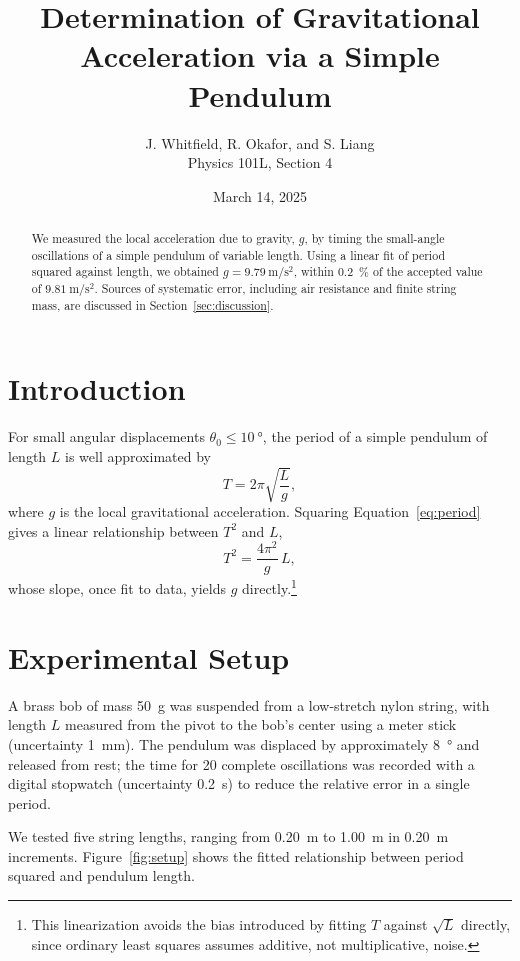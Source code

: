 \documentclass[11pt]{article}
\title{Determination of Gravitational Acceleration via a Simple Pendulum}
\author{J. Whitfield, R. Okafor, and S. Liang \\ Physics 101L, Section 4}
\date{March 14, 2025}
\begin{document}
\maketitle

\begin{abstract}
We measured the local acceleration due to gravity, $g$, by timing the small-angle
oscillations of a simple pendulum of variable length. Using a linear fit of period
squared against length, we obtained $g = \SI{9.79}{\metre\per\second\squared}$, within
\SI{0.2}{\percent} of the accepted value of $\SI{9.81}{\metre\per\second\squared}$. Sources
of systematic error, including air resistance and finite string mass, are discussed in
Section~\ref{sec:discussion}.
\end{abstract}

\section{Introduction}

For small angular displacements $\theta_0 \leq \SI{10}{\degree}$, the period of a simple
pendulum of length $L$ is well approximated by
\begin{equation}
  T = 2\pi \sqrt{\frac{L}{g}},
  \label{eq:period}
\end{equation}
where $g$ is the local gravitational acceleration. Squaring Equation~\ref{eq:period} gives
a linear relationship between $T^2$ and $L$,
\[
  T^2 = \frac{4\pi^2}{g}\, L,
\]
whose slope, once fit to data, yields $g$ directly.\footnote{This linearization avoids the
bias introduced by fitting $T$ against $\sqrt{L}$ directly, since ordinary least squares
assumes additive, not multiplicative, noise.}

\section{Experimental Setup}

A brass bob of mass \SI{50}{\gram} was suspended from a low-stretch nylon string, with
length $L$ measured from the pivot to the bob's center using a meter stick (uncertainty
\SI{1}{\milli\metre}). The pendulum was displaced by approximately \SI{8}{\degree} and
released from rest; the time for 20 complete oscillations was recorded with a digital
stopwatch (uncertainty \SI{0.2}{\second}) to reduce the relative error in a single period.

We tested five string lengths, ranging from \SI{0.20}{\metre} to \SI{1.00}{\metre} in
\SI{0.20}{\metre} increments. Figure~\ref{fig:setup} shows the fitted relationship between
period squared and pendulum length.
\end{document}
